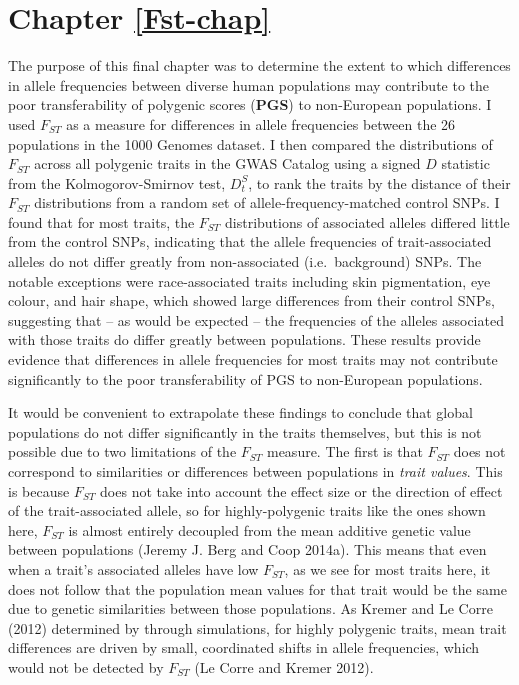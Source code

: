 \documentclass[
]{book}
\begin{document}
\hypertarget{chapter-reffst-chap}{%
\section*{Chapter \ref{Fst-chap}}\label{chapter-reffst-chap}}

The purpose of this final chapter was to determine the extent to which differences in allele frequencies between diverse human populations may contribute to the poor transferability of polygenic scores (\textbf{PGS}) to non-European populations. I used \(F_{ST}\) as a measure for differences in allele frequencies between the 26 populations in the 1000 Genomes dataset. I then compared the distributions of \(F_{ST}\) across all polygenic traits in the GWAS Catalog using a signed \(D\) statistic from the Kolmogorov-Smirnov test, \({D_t^S}\), to rank the traits by the distance of their \(F_{ST}\) distributions from a random set of allele-frequency-matched control SNPs. I found that for most traits, the \(F_{ST}\) distributions of associated alleles differed little from the control SNPs, indicating that the allele frequencies of trait-associated alleles do not differ greatly from non-associated (i.e.~background) SNPs. The notable exceptions were race-associated traits including skin pigmentation, eye colour, and hair shape, which showed large differences from their control SNPs, suggesting that -- as would be expected -- the frequencies of the alleles associated with those traits do differ greatly between populations. These results provide evidence that differences in allele frequencies for most traits may not contribute significantly to the poor transferability of PGS to non-European populations.

It would be convenient to extrapolate these findings to conclude that global populations do not differ significantly in the traits themselves, but this is not possible due to two limitations of the \(F_{ST}\) measure. The first is that \(F_{ST}\) does not correspond to similarities or differences between populations in \emph{trait values}. This is because \(F_{ST}\) does not take into account the effect size or the direction of effect of the trait-associated allele, so for highly-polygenic traits like the ones shown here, \(F_{ST}\) is almost entirely decoupled from the mean additive genetic value between populations (Jeremy J. Berg and Coop 2014a). This means that even when a trait's associated alleles have low \(F_{ST}\), as we see for most traits here, it does not follow that the population mean values for that trait would be the same due to genetic similarities between those populations. As Kremer and Le Corre (2012) determined by through simulations, for highly polygenic traits, mean trait differences are driven by small, coordinated shifts in allele frequencies, which would not be detected by \(F_{ST}\) (Le Corre and Kremer 2012).
\end{document}
